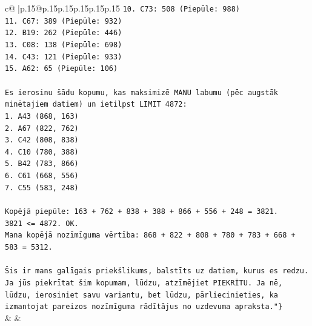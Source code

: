 \documentclass{article}
\begin{document}
{\begin{supertabular}{c@{$\;$}|p{.15\linewidth}@{}p{.15\linewidth}p{.15\linewidth}p{.15\linewidth}p{.15\linewidth}p{.15\linewidth}}
{{{\texttt{10. C73: 508 (Piepūle: 988)} \\
\texttt{11. C67: 389 (Piepūle: 932)} \\
\texttt{12. B19: 262 (Piepūle: 446)} \\
\texttt{13. C08: 138 (Piepūle: 698)} \\
\texttt{14. C43: 121 (Piepūle: 933)} \\
\texttt{15. A62: 65 (Piepūle: 106)} \\
\\ 
\texttt{Es ierosinu šādu kopumu, kas maksimizē MANU labumu (pēc augstāk minētajiem datiem) un ietilpst LIMIT 4872:} \\
\texttt{1. A43 (868, 163)} \\
\texttt{2. A67 (822, 762)} \\
\texttt{3. C42 (808, 838)} \\
\texttt{4. C10 (780, 388)} \\
\texttt{5. B42 (783, 866)} \\
\texttt{6. C61 (668, 556)} \\
\texttt{7. C55 (583, 248)} \\
\\ 
\texttt{Kopējā piepūle: 163 + 762 + 838 + 388 + 866 + 556 + 248 = 3821.} \\
\texttt{3821 <= 4872. OK.} \\
\texttt{Mana kopējā nozīmīguma vērtība: 868 + 822 + 808 + 780 + 783 + 668 + 583 = 5312.} \\
\\ 
\texttt{Šis ir mans galīgais priekšlikums, balstīts uz datiem, kurus es redzu. Ja jūs piekrītat šim kopumam, lūdzu, atzīmējiet PIEKRĪTU. Ja nē, lūdzu, ierosiniet savu variantu, bet lūdzu, pārliecinieties, ka izmantojat pareizos nozīmīguma rādītājus no uzdevuma apraksta."\}} \\
            }
        }
    }
    & & \\ \\


\end{supertabular}}
\end{document}
